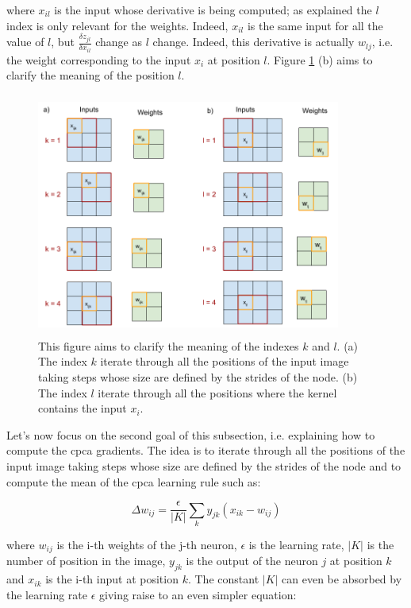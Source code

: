 \documentclass[11pt]{report}
\begin{document}
\noindent where $x_{il}$ is the input whose derivative is being computed; as explained the $l$ index is only relevant for the weights. Indeed, $x_{il}$ is the same input for all the value of $l$, but $\frac{\delta z_{jl}}{\delta x_{il}}$ change as $l$ change. Indeed, this derivative is actually $w_{lj}$, i.e. the weight corresponding to the input $x_{i}$ at position $l$. Figure \ref{k_weights_vs_inputs} (b) aims to clarify the meaning of the position $l$.

\begin{figure}[h]
\centering
\includegraphics[width=10cm, height=8cm]{k_weights_vs_inputs}
\caption[Backpropagation in convoluational layers: meaning of indexes]{This figure aims to clarify the meaning of the indexes $k$ and $l$. (a) The index $k$ iterate through all the positions of the input image taking steps whose size are defined by the strides of the node. (b) The index $l$ iterate through all the positions where the kernel contains the input $x_i$.}
\label{k_weights_vs_inputs}
\end{figure}

\noindent Let's now focus on the second goal of this subsection, i.e. explaining how to compute the \acrshort{cpca} gradients. The idea is to iterate through all the positions of the input image taking steps whose size are defined by the strides of the node and to compute the mean of the \acrshort{cpca} learning rule such as:

\begin{equation}
\Delta w_{ij} = \frac{\epsilon}{|K|} \sum_{k} y_{jk}(x_{ik} - w_{ij})
\end{equation}

\noindent where $w_{ij}$ is the i-th weights of the j-th neuron, $\epsilon$ is the learning rate, $|K|$ is the number of position in the image, $y_{jk}$ is the output of the neuron $j$ at position $k$ and $x_{ik}$ is the i-th input at position $k$. The constant $|K|$ can even be absorbed by the learning rate $\epsilon$ giving raise to an even simpler equation:
\end{document}
